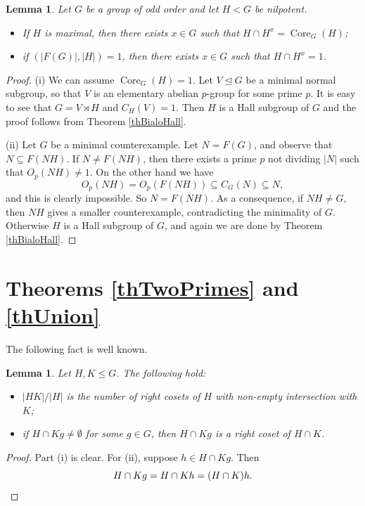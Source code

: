 \documentclass[11pt]{amsart}
\numberwithin{equation}{section}
\newtheorem{lemma}[theorem]{Lemma}
\theoremstyle{definition}
\theoremstyle{remark}
\newcommand{\Core}{\mathop{\mathrm{Core}}}
\begin{document}
\begin{lemma} \label{lemImprov}
Let $G$ be a group of odd order and let $H < G$ be nilpotent.
\begin{itemize}
\item[(i)] If $H$ is maximal, then there exists $x \in G$ such that $H \cap H^x = \Core_G(H)$;
\item[(ii)] if $(|F(G)|,|H|) = 1$, then there exists $x \in G$ such that $H \cap H^x =1$.
\end{itemize}
\end{lemma}
\begin{proof}
(i) We can assume $\Core_G(H)=1$.
Let $V \unlhd G$ be a minimal normal subgroup, so that $V$ is an elementary abelian $p$-group for some prime $p$.
It is easy to see that $G=V \rtimes H$ and $C_H(V)=1$.
Then $H$ is a Hall subgroup of $G$ and the proof follows from Theorem \ref{thBialoHall}.

(ii) Let $G$ be a minimal counterexample.
Let $N=F(G)$, and observe that $N \subseteq F(NH)$.
If $N \neq F(NH)$, then there exists a prime $p$ not dividing $|N|$ such that $O_p(NH) \neq 1$.
On the other hand we have
$$ O_p(NH) = O_p(F(NH)) \subseteq C_G(N) \subseteq N , $$
and this is clearly impossible.
So $N=F(NH)$. As a consequence, if $NH \neq G$, then $NH$ gives a smaller counterexample, contradicting the minimality of $G$.
Otherwise $H$ is a Hall subgroup of $G$, and again we are done by Theorem \ref{thBialoHall}.
\end{proof} 




\vspace{0.1cm}
\section{Theorems \ref{thTwoPrimes} and \ref{thUnion}} \label{sec3}

The following fact is well known.

\begin{lemma} \label{lemCosets}
Let $H,K \leqslant G$. The following hold:
\begin{itemize}
    \item[(i)] $|HK|/|H|$ is the number of right cosets of $H$ with non-empty intersection with $K$;
    \item[(ii)] if $H \cap Kg \neq \emptyset$ for some $g \in G$,
    then $H \cap Kg$ is a right coset of $H \cap K$. 
\end{itemize}
\end{lemma}
\begin{proof}
Part (i) is clear. For (ii), suppose $h \in H \cap Kg$.
Then
$$ H \cap Kg = H \cap Kh = (H \cap K)h . \qedhere $$
\end{proof}
\end{document}
